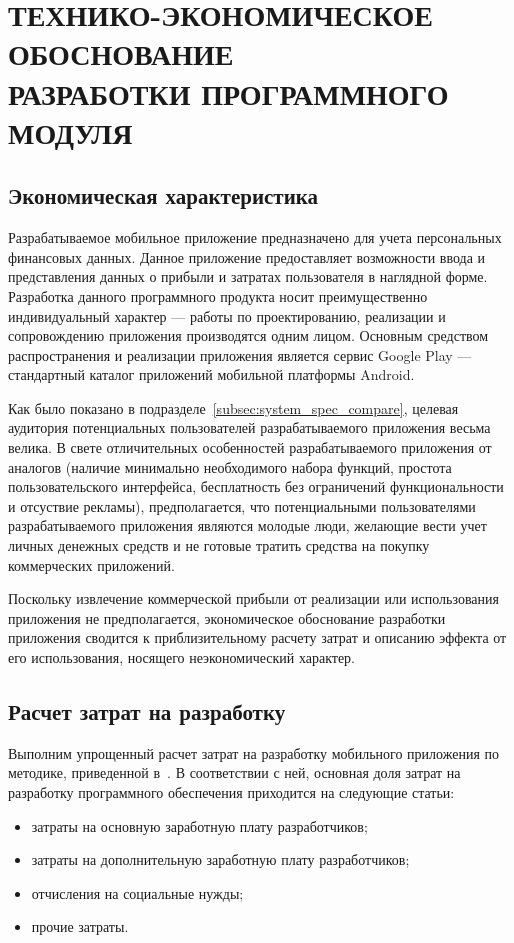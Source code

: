 \section[Технико-экономическое обоснование]{%
  ТЕХНИКО-ЭКОНОМИЧЕСКОЕ ОБОСНОВАНИЕ \\
  РАЗРАБОТКИ ПРОГРАММНОГО МОДУЛЯ
}\label{sec:teo}

\subsection{Экономическая характеристика}

Разрабатываемое мобильное приложение предназначено для учета
персональных финансовых данных.
Данное приложение предоставляет возможности ввода и представления
данных о прибыли и затратах пользователя в наглядной форме.
Разработка данного программного продукта носит преимущественно
индивидуальный характер --- работы по проектированию, реализации и
сопровождению приложения производятся одним лицом.
Основным средством распространения и реализации приложения является сервис
Google Play --- стандартный каталог приложений мобильной платформы Android.

Как было показано в подразделе~\ref{subsec:system_spec_compare}, целевая аудитория
потенциальных пользователей разрабатываемого приложения весьма велика.
В свете отличительных особенностей разрабатываемого приложения от аналогов
(наличие минимально необходимого набора функций,
простота пользовательского интерфейса,
бесплатность без ограничений функциональности и отсуствие рекламы),
предполагается, что потенциальными пользователями разрабатываемого
приложения являются молодые люди, желающие вести учет личных денежных
средств и не готовые тратить средства на покупку коммерческих приложений.

Поскольку извлечение коммерческой прибыли от реализации или использования приложения
не предполагается, экономическое обоснование разработки приложения
сводится к приблизительному расчету затрат и описанию эффекта от его использования,
носящего неэкономический характер.

\subsection{Расчет затрат на разработку}

Выполним упрощенный расчет затрат на разработку мобильного приложения
по методике, приведенной в~\cite{diploma_teo}. В соответствии с ней,
основная доля затрат на разработку программного обеспечения приходится
на следующие статьи:
\begin{itemize}
  \item затраты на основную заработную плату разработчиков;
  \item затраты на дополнительную заработную плату разработчиков;
  \item отчисления на социальные нужды;
  \item прочие затраты.
\end{itemize}

